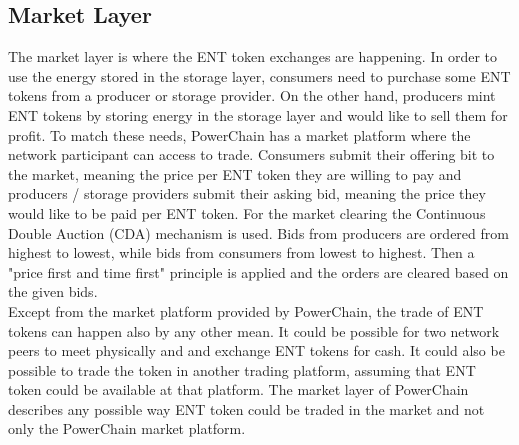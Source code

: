 \subsection{Market Layer}
The market layer is where the ENT token exchanges are happening. In order to use the energy stored in the storage layer, consumers need to purchase some ENT tokens from a producer or storage provider.
On the other hand, producers mint ENT tokens by storing energy in the storage layer and would like to sell them for profit. To match these needs, PowerChain has a market platform
where the network participant can access to trade. Consumers submit their offering bit to the market, meaning the price per ENT token they are willing to pay and producers / storage providers submit
their asking bid, meaning the price they would like to be paid per ENT token. For the market clearing the Continuous Double Auction (CDA) mechanism is used. Bids from producers are
ordered from highest to lowest, while bids from consumers from lowest to highest. Then a "price first and time first" principle is applied and the orders are cleared based on the given
bids.\\
Except from the market platform provided by PowerChain, the trade of ENT tokens can happen also by any other mean. It could be possible for two network peers to meet physically and
and exchange ENT tokens for cash. It could also be possible to trade the token in another trading platform, assuming that ENT token could be available at that platform. The market layer of PowerChain 
describes any possible way ENT token could be traded in the market and not only the PowerChain market platform.

